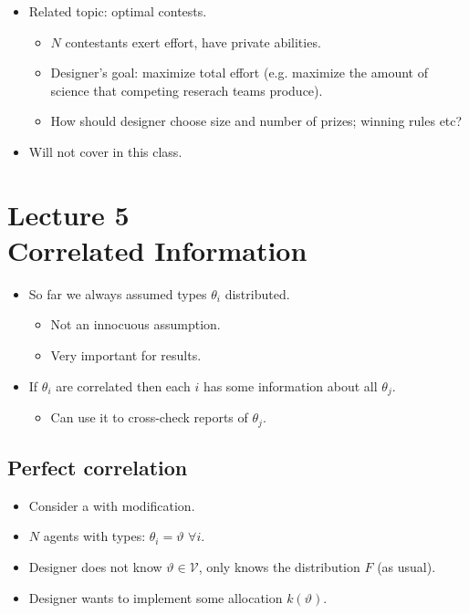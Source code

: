 \documentclass[english,handout]{beamer}		%
\def\lyxframeend{} %
\begin{document}
\begin{itemize}
	\item Related topic: optimal contests.
	\begin{itemize}
		\item $N$ contestants exert effort, have private abilities.
		\item Designer's goal: maximize total effort (e.g. maximize the amount of science that competing reserach teams produce).
		\item How should designer choose size and number of prizes; winning rules etc? 
	\end{itemize}
	\item Will not cover in this class.
\end{itemize}
\lyxframeend





\section{Lecture 5 \\ Correlated Information}

\begin{itemize}
	\item So far we always assumed types $\theta_i$  distributed.
	\begin{itemize}
		\item Not an innocuous assumption.
		\item Very important for results.
	\end{itemize}
	\item If $\theta_i$ are correlated then each $i$ has some information about all $\theta_j$.
	\begin{itemize}
		\item Can use it to cross-check reports of $\theta_j$.
	\end{itemize}
\end{itemize}
\lyxframeend


\subsection{Perfect correlation}

\begin{itemize}
	\item Consider a  with modification.
	\item $N$ agents with  types: $\theta_i = \vartheta$ $\forall i$.
	\item Designer does not know $\vartheta \in \mathcal{V}$, only knows the distribution $F$ (as usual).
	\item Designer wants to implement some allocation $k(\vartheta)$.
\end{itemize}
\lyxframeend
\end{document}
